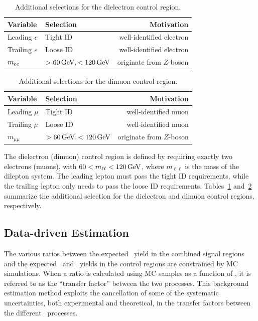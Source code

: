 \begin{table}[htbp]
  \centering
    \begin{tabular}{l | l | r}
      Variable & Selection & Motivation \\
      \hline
      Leading ${e}$ & Tight ID & well-identified electron \\
      Trailing ${e}$ & Loose ID & well-identified electron \\
      $m_{{e}{e}}$ & $> 60\,\text{Ge\hspace{-.08em}V}, < 120\,\text{Ge\hspace{-.08em}V}$ & originate from $Z$-boson
    \end{tabular}
  \caption{Additional selections for the dielectron control region.} 
  \label{tab:dielectron}
\end{table}

\begin{table}[htbp]
  \centering
    \begin{tabular}{l | l | r}
      Variable & Selection & Motivation \\
      \hline
      Leading $\mu$ & Tight ID & well-identified muon \\
      Trailing $\mu$ & Loose ID & well-identified muon \\
      $m_{\mu\mu}$ & $> 60\,\text{Ge\hspace{-.08em}V}, < 120\,\text{Ge\hspace{-.08em}V}$ & originate from $Z$-boson
    \end{tabular}
  \caption{Additional selections for the dimuon control region.} 
  \label{tab:dimuon}
\end{table}

The dielectron (dimuon) control region is defined by requiring exactly two electrons (muons), with $60 < m_{\ell\ell} < 120\,\text{Ge\hspace{-.08em}V}$, where $m_{\ell\ell}$ is the mass of the dilepton system.
The leading lepton must pass the tight ID requirements, while the trailing lepton only needs to pass the loose ID requirements.
Tables~\ref{tab:dielectron} and~\ref{tab:dimuon} summarize the additional selection for the dielectron and dimuon control regions, respectively.

\subsection{Data-driven Estimation}
\label{sec:transfer_factors}

The various ratios between the expected \zinvg\ yield in the combined signal regions and the expected \wlng\ and \zllg\ yields in the control regions are constrained by MC simulations.
When a ratio is calculated using MC samples as a function of \ETg, it is referred to as the ``transfer factor'' between the two processes.
This background estimation method exploits the cancellation of some of the systematic uncertainties, both experimental and theoretical, in the transfer factors between the different  \vg\ processes.
 
